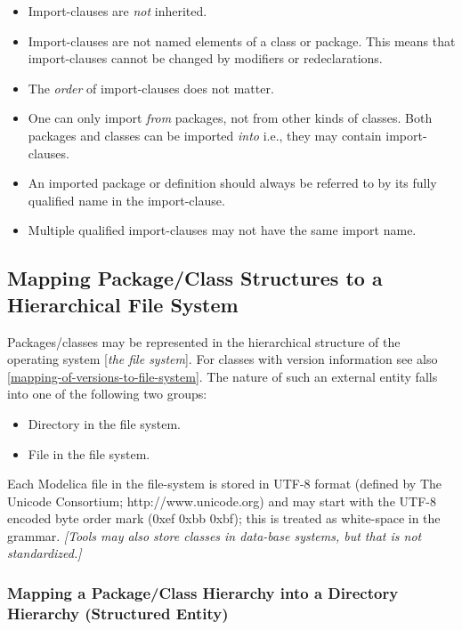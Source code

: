 \begin{itemize}
\item
  Import-clauses are \emph{not} inherited.
\item
  Import-clauses are not named elements of a class or package. This
  means that import-clauses cannot be changed by modifiers or
  redeclarations.
\item
  The \emph{order} of import-clauses does not matter.
\item
  One can only import \emph{from} packages, not from other kinds of
  classes. Both packages and classes can be imported \emph{into} i.e.,
  they may contain import-clauses.
\item
  An imported package or definition should always be referred to by its
  fully qualified name in the import-clause.
\item
  Multiple qualified import-clauses may not have the same import name.
\end{itemize}

\subsection{Mapping Package/Class Structures to a Hierarchical File System}

Packages/classes may be represented in the hierarchical structure of the
operating system {[}\emph{the file system}{]}. For classes with version
information see also \ref{mapping-of-versions-to-file-system}. The nature of such an external
entity falls into one of the following two groups:

\begin{itemize}
\item
  Directory in the file system.
\end{itemize}

\begin{itemize}
\item
  File in the file system.
\end{itemize}

Each Modelica file in the file-system is stored in UTF-8 format (defined
by The Unicode Consortium; http://www.unicode.org) and may start with
the UTF-8 encoded byte order mark (0xef 0xbb 0xbf); this is treated as
white-space in the grammar. \emph{{[}Tools may also store classes in
data-base systems, but that is not standardized.{]}}

\subsubsection{Mapping a Package/Class Hierarchy into a Directory Hierarchy (Structured Entity)}

